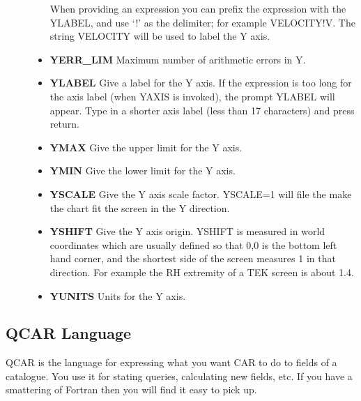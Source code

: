 \begin{description}
\begin{itemize}
When providing an expression you can prefix the expression with the YLABEL,
and use `!' as the delimiter; for example VELOCITY!V.  
The string VELOCITY will be used to label the Y axis.
\item{\bf YERR\_LIM} Maximum number of arithmetic errors in Y.
\item{\bf YLABEL} Give a label for the Y axis. 
If the expression is too long for the axis label (when YAXIS is invoked),
the prompt YLABEL will appear. 
Type in a shorter axis label (less than 17 characters) and press return.
\item{\bf YMAX} Give the upper limit for the Y axis.
\item{\bf YMIN} Give the lower limit for the Y axis.
\item{\bf YSCALE} Give the Y axis scale factor.
YSCALE=1 will file the make the chart fit the screen in the Y direction.
\item{\bf YSHIFT} Give the Y axis origin. 
YSHIFT is measured in world coordinates which are usually defined so that 
0,0 is the bottom left hand corner, and the shortest side of the screen 
measures 1 in that direction. 
For example the RH extremity of a TEK screen is about 1.4. 
\item{\bf YUNITS} Units for the Y axis.
\end{itemize}
\end{description}

\subsection {QCAR Language}

QCAR is the language for expressing what you want CAR to do to fields of a
catalogue.
You use it for stating queries, calculating new fields, etc.
If you have a smattering of Fortran then you will find it easy to pick up.
